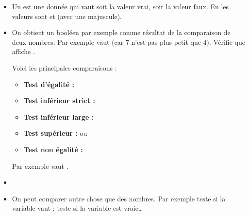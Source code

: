 \documentclass[11pt,class=report,crop=false]{standalone}
\begin{document}

\begin{cours}[Booléens]
\sauteligne
\begin{itemize}
  \item Un  est une donnée qui vaut soit la valeur \og{}vrai\fg{}, soit la valeur \og{}faux\fg{}. En \Python{} les valeurs sont  et  (avec une majuscule).
  
  \item On obtient un booléen par exemple comme résultat de la comparaison de deux nombres.
  Par exemple  vaut  (car $7$ n'est pas plus petit que $4$). 
  Vérifie que  affiche .
  
  Voici les principales comparaisons :
  \begin{itemize}
    \item \textbf{Test d'égalité :}\quad {}\index{\ci{==}}
    	\item \textbf{Test inférieur strict :}\quad {}
    	\item \textbf{Test inférieur large :}\quad {}\index{\ci{<=}}
    	\item \textbf{Test supérieur :}\quad {} \quad ou \quad {}\index{\ci{>=}}
    	\item \textbf{Test non égalité :}\quad {}
  \end{itemize}
   
   Par exemple  vaut .
   

   
   
   \item ~
   
  \item On peut comparer autre chose que des nombres. Par exemple 
  \og{}\fg{} teste si la variable  vaut  ; \og{}\fg{} teste si la variable  est vraie\ldots
  

\end{itemize}
\end{cours}
\end{document}
